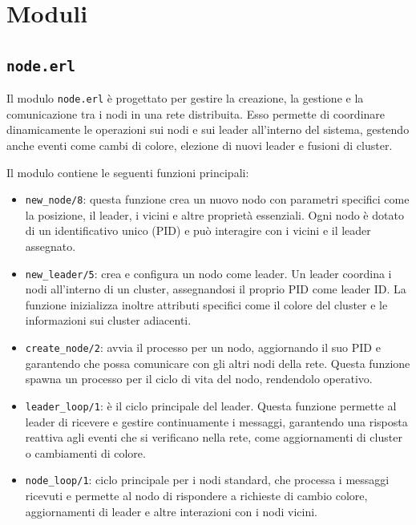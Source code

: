 \documentclass[12pt, a4paper]{report}
\begin{document}
\section{Moduli}

\subsection{\texttt{node.erl}}

Il modulo \texttt{node.erl} \`e progettato per gestire la creazione, la gestione e la comunicazione tra i nodi in una rete distribuita. Esso permette di coordinare dinamicamente le operazioni sui nodi e sui leader all'interno del sistema, gestendo anche eventi come cambi di colore, elezione di nuovi leader e fusioni di cluster.

Il modulo contiene le seguenti funzioni principali:

\begin{itemize}
    \item \texttt{new\_node/8}: questa funzione crea un nuovo nodo con parametri specifici come la posizione, il leader, i vicini e altre proprietà essenziali. Ogni nodo \`e dotato di un identificativo unico (PID) e può interagire con i vicini e il leader assegnato.

    \item \texttt{new\_leader/5}: crea e configura un nodo come leader. Un leader coordina i nodi all'interno di un cluster, assegnandosi il proprio PID come leader ID. La funzione inizializza inoltre attributi specifici come il colore del cluster e le informazioni sui cluster adiacenti.

    \item \texttt{create\_node/2}: avvia il processo per un nodo, aggiornando il suo PID e garantendo che possa comunicare con gli altri nodi della rete. Questa funzione spawna un processo per il ciclo di vita del nodo, rendendolo operativo.

    \item \texttt{leader\_loop/1}: \`e il ciclo principale del leader. Questa funzione permette al leader di ricevere e gestire continuamente i messaggi, garantendo una risposta reattiva agli eventi che si verificano nella rete, come aggiornamenti di cluster o cambiamenti di colore.

    \item \texttt{node\_loop/1}: ciclo principale per i nodi standard, che processa i messaggi ricevuti e permette al nodo di rispondere a richieste di cambio colore, aggiornamenti di leader e altre interazioni con i nodi vicini.

\end{itemize}
\end{document}
